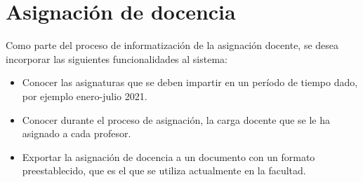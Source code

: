 













\section{Asignación de docencia}\label{docencia:cap2}

Como parte del proceso de informatización de la asignación docente, se 
desea incorporar las siguientes funcionalidades al sistema:


\begin{itemize}
    \item Conocer las asignaturas que se deben impartir en un período de tiempo dado, por ejemplo enero-julio 2021.
    \item Conocer durante el proceso de asignación, la carga docente que se le ha asignado a cada profesor.
    \item Exportar la asignación de docencia a un documento con un formato preestablecido, que 
    es el que se utiliza actualmente en la facultad.
\end{itemize}

